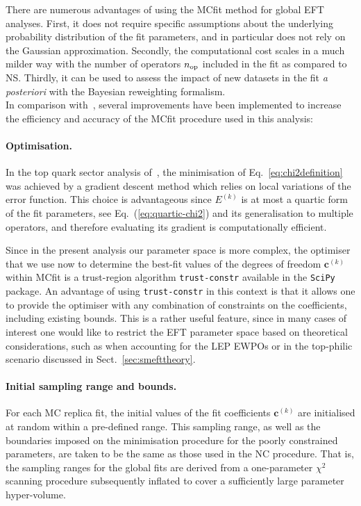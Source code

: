 There are numerous advantages of using the MCfit method for 
global EFT analyses. 
%
First, it does not require specific 
assumptions about the underlying probability distribution
of the fit parameters, and in particular does not rely
on the Gaussian approximation.
%
Secondly, the computational cost scales in a much milder way 
with the number of operators 
$n_{\rm op}$ included in the fit as compared to NS. 
%
Thirdly, it can be used to assess the impact of new datasets in the fit
{\it a posteriori}
with the Bayesian reweighting formalism.\\[-0.3cm]

In comparison with~\cite{Hartland:2019bjb}, several improvements
have been implemented to increase the efficiency and accuracy of the MCfit procedure 
used in this analysis:

\paragraph{Optimisation.}
%
In the top quark sector analysis of~\cite{Hartland:2019bjb}, the minimisation of 
Eq.~\eqref{eq:chi2definition} was achieved by a gradient descent method which relies 
on local variations of the error function.
%
This choice is advantageous since $E^{(k)}$ is at most a quartic form
of the fit parameters, see Eq.~(\ref{eq:quartic-chi2}) and its generalisation
to multiple operators, and therefore evaluating its gradient is computationally efficient.

Since in the present analysis our parameter space is more complex, the optimiser that we use now to 
determine the best-fit values of the degrees of freedom ${\boldsymbol c}^{(k)}$ within MCfit is a 
trust-region algorithm {\tt trust-constr} available in the {\tt SciPy} package. 
%
An advantage of using {\tt trust-constr} in this context is that it allows 
one to provide the optimiser with any combination of constraints on the 
coefficients, including existing bounds.
%
This is a rather useful feature, since in many cases of interest one would like to restrict
the EFT parameter space based on theoretical considerations, such as when
accounting for the LEP EWPOs or in the top-philic scenario discussed in Sect.~\ref{sec:smefttheory}.

\paragraph{Initial sampling range and bounds.}
%
For each MC replica fit, the initial values of the fit coefficients ${\boldsymbol c}^{(k)}$
are initialised at random within a pre-defined range.
%
This sampling range, as well as the boundaries imposed on the minimisation procedure for the poorly constrained
parameters,
are taken to be the same as those used in the NC procedure.
%
That is, the sampling ranges for the global fits are derived from a one-parameter
$\chi^2$ scanning procedure subsequently
inflated to cover a sufficiently large parameter hyper-volume. 

